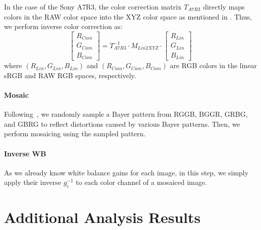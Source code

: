 In the case of the Sony A7R3, the color correction matrix $T_{A7R3}$ directly maps colors in the RAW color space into the XYZ color space as mentioned in .
Thus, we perform inverse color correction as: 
\begin{equation}
    \begin{bmatrix} R_{Cam} \\ G_{Cam} \\ B_{Cam} \end{bmatrix} = T^{-1}_{A7R3} \cdot M_{Lin2XYZ} \cdot \begin{bmatrix} R_{Lin} \\ G_{Lin} \\ B_{Lin} \end{bmatrix}  \label{eq:lin2cam_a7r3}
\end{equation}
where $(R_{Lin}, G_{Lin}, B_{Lin})$ and $(R_{Cam}, G_{Cam}, B_{Cam})$ are RGB colors in the linear sRGB and RAW RGB spaces, respectively.


\paragraph{Mosaic} Following~\cite{Guo_2019_CVPR}, we randomly sample a Bayer pattern from RGGB, BGGR, GRBG, and GBRG to reflect distortions caused by various Bayer patterns.
Then, we perform mosaicing using the sampled pattern.

\paragraph{Inverse WB}
As we already know white balance gains for each image, in this step, we simply apply their inverse $g_c^{-1}$ to each color channel of a mosaiced image.


\section{Additional Analysis Results}

